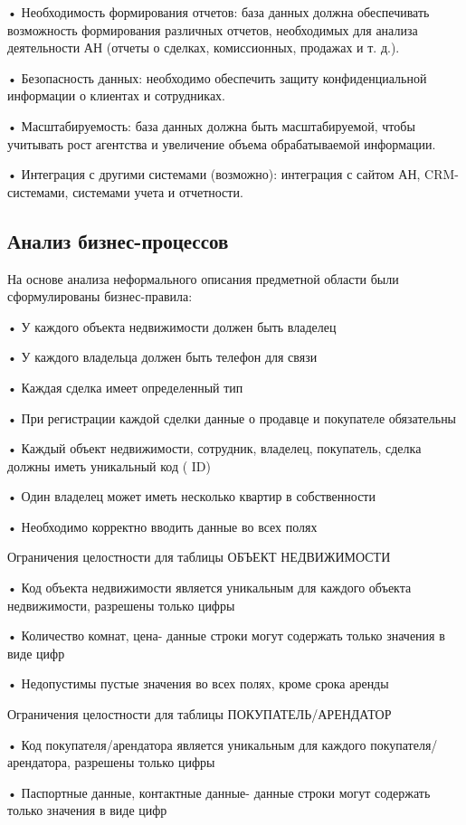 •	Необходимость формирования отчетов: база данных должна обеспечивать возможность формирования различных отчетов, необходимых для анализа деятельности АН (отчеты о сделках, комиссионных, продажах и т. д.).

•	Безопасность данных: необходимо обеспечить защиту конфиденциальной информации о клиентах и сотрудниках.

•	Масштабируемость: база данных должна быть масштабируемой, чтобы учитывать рост агентства и увеличение объема обрабатываемой информации.

•	Интеграция с другими системами (возможно): интеграция с сайтом АН, CRM-системами, системами учета и отчетности.


\subsection{Анализ бизнес-процессов}
	
На основе анализа неформального описания предметной области были сформулированы бизнес-правила:

•	У каждого объекта недвижимости должен быть владелец

•	У каждого владельца должен быть телефон для связи

•	Каждая сделка имеет определенный тип

•	При регистрации каждой сделки данные о продавце и покупателе обязательны

•	Каждый объект недвижимости, сотрудник, владелец, покупатель, сделка должны иметь уникальный код ( ID)

•	Один владелец может иметь несколько квартир в собственности

•	Необходимо корректно вводить данные во всех полях

Ограничения целостности для таблицы ОБЪЕКТ НЕДВИЖИМОСТИ

•	Код объекта недвижимости является уникальным для каждого объекта недвижимости, разрешены только цифры

•	Количество комнат, цена- данные строки могут содержать только значения в виде цифр

•	Недопустимы пустые значения во всех полях, кроме срока аренды

Ограничения целостности для таблицы ПОКУПАТЕЛЬ/АРЕНДАТОР

•	Код покупателя/арендатора является уникальным для каждого покупателя/арендатора, разрешены только цифры

•	Паспортные данные, контактные данные- данные строки могут содержать только значения в виде цифр

